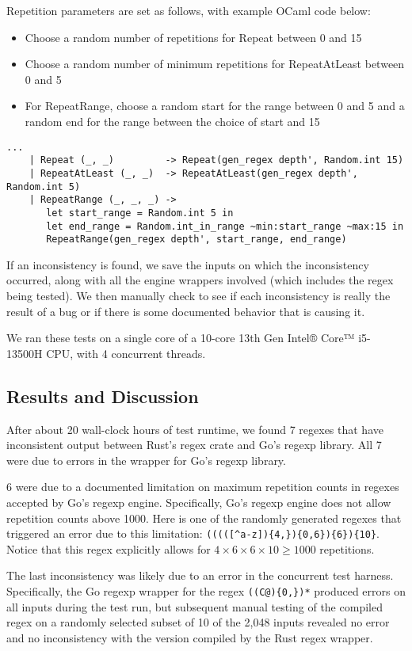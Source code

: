 \documentclass[acmsmall,nonacm,screen]{acmart}
\begin{document}
Repetition parameters are set as follows, with example OCaml code below:
\begin{itemize}
\item Choose a random number of repetitions for Repeat between 0 and 15
\item Choose a random number of minimum repetitions for RepeatAtLeast between 0 and 5
\item For RepeatRange, choose a random start for the range between 0 and 5 and a random end for the range between the choice of start and 15
\end{itemize}

\begin{verbatim}
...
    | Repeat (_, _)         -> Repeat(gen_regex depth', Random.int 15)
    | RepeatAtLeast (_, _)  -> RepeatAtLeast(gen_regex depth', Random.int 5)
    | RepeatRange (_, _, _) ->
       let start_range = Random.int 5 in
       let end_range = Random.int_in_range ~min:start_range ~max:15 in
       RepeatRange(gen_regex depth', start_range, end_range)
\end{verbatim}

If an inconsistency is found, we save the inputs on which the inconsistency occurred, along with all the engine wrappers involved (which includes the regex being tested). We then manually check to see if each inconsistency is really the result of a bug or if there is some documented behavior that is causing it.

We ran these tests on a single core of a 10-core 13th Gen Intel® Core™ i5-13500H CPU, with 4 concurrent threads.

\subsection{Results and Discussion}
After about 20 wall-clock hours of test runtime, we found 7 regexes that have inconsistent output between Rust's regex crate and Go's regexp library. All 7 were due to errors in the wrapper for Go's regexp library.

6 were due to a documented limitation on maximum repetition counts in regexes accepted by Go's regexp engine. Specifically, Go's regexp engine does not allow repetition counts above 1000. Here is one of the randomly generated regexes that triggered an error due to this limitation: \verb|(((([^a-z]){4,}){0,6}){6}){10}|. Notice that this regex explicitly allows for $4 \times 6 \times 6 \times 10 \geq 1000$ repetitions.

The last inconsistency was likely due to an error in the concurrent test harness. Specifically, the Go regexp wrapper for the regex \verb|((C@){0,})*| produced errors on all inputs during the test run, but subsequent manual testing of the compiled regex on a randomly selected subset of 10 of the 2,048 inputs revealed no error and no inconsistency with the version compiled by the Rust regex wrapper.
\end{document}
